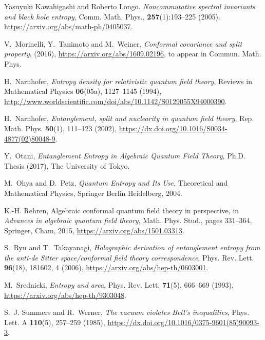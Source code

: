 \documentclass[a4paper,12pt]{article}
\theoremstyle{plain}
\theoremstyle{definition}
\theoremstyle{remark}
\begin{document}
{\begin{thebibliography}{{Haa}96}
Yasuyuki Kawahigashi and Roberto Longo.
\newblock \textsl{Noncommutative spectral invariants and black hole entropy},
\newblock Comm. Math. Phys., \textbf{257}(1):193--225 (2005).
\newblock \url{https://arxiv.org/abs/math-ph/0405037}.

V.~Morinelli, Y.~Tanimoto and M.~Weiner, \textsl{ Conformal covariance and
  split property},
\newblock (2016),
\newblock \url{https://arxiv.org/abs/1609.02196}, to appear in Commun. Math.
  Phys.

H.~Narnhofer, \textsl{ Entropy density for relativistic quantum field theory},
\newblock Reviews in Mathematical Physics \textbf{ 06}(05a), 1127--1145 (1994),
\newblock
  \url{http://www.worldscientific.com/doi/abs/10.1142/S0129055X94000390}.

H.~Narnhofer, \textsl{ Entanglement, split and nuclearity in quantum field
  theory},
\newblock Rep. Math. Phys. \textbf{ 50}(1), 111--123 (2002),
\newblock \url{https://dx.doi.org/10.1016/S0034-4877(02)80048-9}.

Y.~Otani,
\newblock \textsl{ Entanglement Entropy in Algebraic Quantum Field Theory},
\newblock Ph.D.\! Thesis (2017), The University of Tokyo.

M.~Ohya and D.~Petz,
\newblock \textsl{ Quantum Entropy and Its Use},
\newblock Theoretical and Mathematical Physics, Springer Berlin Heidelberg,
  2004.

K.-H. Rehren,
\newblock Algebraic conformal quantum field theory in perspective,
\newblock in \textsl{ Advances in algebraic quantum field theory}, Math. Phys.
  Stud., pages 331--364, Springer, Cham, 2015,
\newblock \url{https://arxiv.org/abs/1501.03313}.

S.~Ryu and T.~Takayanagi, \textsl{ Holographic derivation of entanglement
  entropy from the anti-de {S}itter space/conformal field theory
  correspondence},
\newblock Phys. Rev. Lett. \textbf{ 96}(18), 181602, 4 (2006),
\newblock \url{https://arxiv.org/abs/hep-th/0603001}.

M.~Srednicki, \textsl{ Entropy and area},
\newblock Phys. Rev. Lett. \textbf{ 71}(5), 666--669 (1993),
\newblock \url{https://arxiv.org/abs/hep-th/9303048}.

S.~J. Summers and R.~Werner, \textsl{ The vacuum violates {B}ell's
  inequalities},
\newblock Phys. Lett. A \textbf{ 110}(5), 257--259 (1985),
\newblock \url{https://dx.doi.org/10.1016/0375-9601(85)90093-3}.


\end{thebibliography}}
\end{document}
